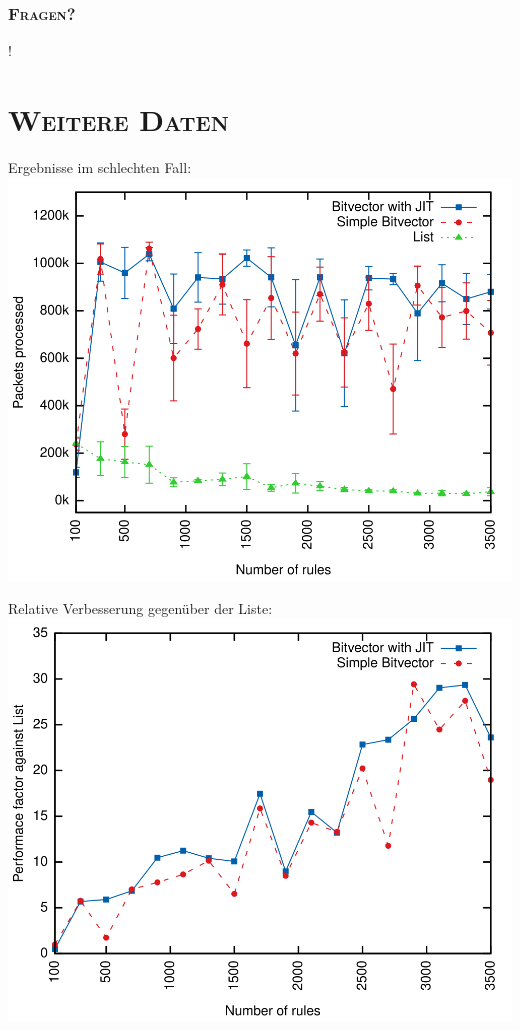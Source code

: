 \documentclass[xcolor=x11names,compress]{beamer}
\renewcommand{\(}{\begin{columns}}
\renewcommand{\)}{\end{columns}}
\newcommand{\<}[1]{\begin{column}{#1}}
\renewcommand{\>}{\end{column}}
\begin{document}
\begin{frame}
  \frametitle{\scshape Fragen?}
  \centering\Huge{!}
\end{frame}

\appendix
\section{\scshape Weitere Daten}
\begin{frame}[noframenumbering]
  Ergebnisse im schlechten Fall:
  \includegraphics[height=0.9\textheight]{figures/eval_w}
\end{frame}

\begin{frame}[noframenumbering]
  Relative Verbesserung gegenüber der Liste:
  \includegraphics[height=0.9\textheight]{figures/eval_w_relative}
\end{frame}
\end{document}
